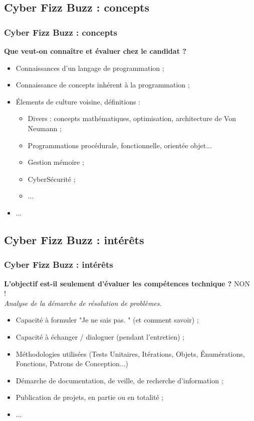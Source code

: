 \documentclass{beamer}
\begin{document}
\subsection{Cyber Fizz Buzz : concepts}
\begin{frame}
	\frametitle{Cyber Fizz Buzz : concepts}
	
	\textbf{Que veut-on conna{\^i}tre et {\'e}valuer chez le candidat ?}~\\
	
	\begin{itemize}
		\item Connaissances d'un langage de programmation ; 
		\item Connaissance de concepts inh{\'e}rent {\`a} la programmation ; 
		\item {\'E}lements de culture voisine, d{\'e}finitions : 
		\begin{itemize}
			\item Divers : concepts math{\'e}matiques, optimisation, architecture de Von Neumann ; 
			\item Programmations proc{\'e}durale, fonctionnelle, orient{\'e}e objet...
			\item Gestion m{\'e}moire ; 
			\item CyberS{\'e}curit{\'e} ; 
			\item ... 
		\end{itemize}
		\item ... 
	\end{itemize}
\end{frame} 

\subsection{Cyber Fizz Buzz : int{\'e}r{\^e}ts}
\begin{frame}
	\frametitle{Cyber Fizz Buzz : int{\'e}r{\^e}ts}
	
	\textbf{L'objectif est-il seulement d'{\'e}valuer les comp{\'e}tences technique ?} NON !~\\
	\emph{Analyse de la d{\'e}marche de r{\'e}solution de probl{\`e}mes. }
	
	\begin{itemize}
		\item Capacit{\'e} {\`a} formuler "Je ne sais pas. " (et comment savoir) ; 
		\item Capacit{\'e} {\`a} {\'e}changer / dialoguer (pendant l'entretien) ; 
		\item M{\'e}thodologies utilis{\'e}es (Tests Unitaires, It{\'e}rations, Objets, {\'E}num{\'e}rations, Fonctions, Patrons de Conception...)
		\item D{\'e}marche de documentation, de veille, de recherche d'information ; 
		\item Publication de projets, en partie ou en totalit{\'e} ; 
		\item ... 
	\end{itemize}
\end{frame} 
\end{document}
